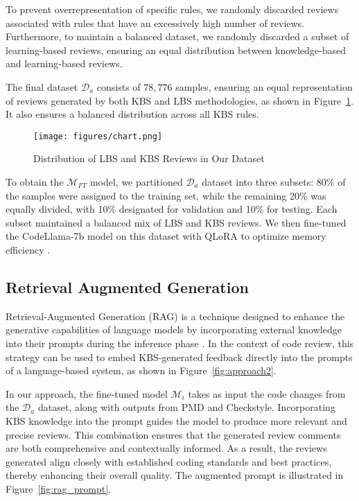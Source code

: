 To prevent overrepresentation of specific rules, we randomly discarded reviews associated with rules that have an excessively high number of reviews. Furthermore, to maintain a balanced dataset, we randomly discarded a subset of learning-based reviews, ensuring an equal distribution between knowledge-based and learning-based reviews.
 
The final dataset \(\mathcal{D}_a\) consists of $78,776$ samples, ensuring an equal representation of reviews generated by both KBS and LBS methodologies, as shown in Figure~\ref{fig:chart}. It also ensures a balanced distribution across all KBS rules. 
\begin{figure}[!htbp]
  \centering
  \vspace{-2em}
  \texttt{[image: figures/chart.png]}
  \caption{Distribution of LBS and KBS Reviews in Our Dataset}
  \label{fig:chart} 
\end{figure}


To obtain the \(\mathcal{M}_{FT}\) model, we partitioned \(\mathcal{D}_a\) dataset into three subsets: 80\% of the samples were assigned to the training set, while the remaining 20\% was equally divided, with 10\% designated for validation and 10\% for testing. Each subset maintained a balanced mix of LBS and KBS reviews. We then fine-tuned the CodeLlama-7b model on this dataset with QLoRA to optimize memory efficiency \cite{hu2021lora}. 



\subsection{Retrieval Augmented Generation}

Retrieval-Augmented Generation (RAG) is a technique designed to enhance the generative capabilities of language models by incorporating external knowledge into their prompts during the inference phase \cite{jiang2023active}. In the context of code review, this strategy can be used to embed KBS-generated feedback directly into the prompts of a language-based system, as shown in Figure~\ref{fig:approach2}.



In our approach, the fine-tuned model \(\mathcal{M}_i\) takes as input the code changes from the \(\mathcal{D}_a\) dataset, along with outputs from PMD and Checkstyle. Incorporating KBS knowledge into the prompt guides the model to produce more relevant and precise reviews. This combination ensures that the generated review comments are both comprehensive and contextually informed. As a result, the reviews generated align closely with established coding standards and best practices, thereby enhancing their overall quality. The augmented prompt is illustrated in Figure~\ref{fig:rag_prompt}.

